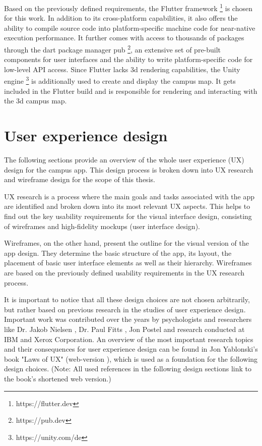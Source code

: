 Based on the previously defined requirements, the Flutter framework \footnote{https://flutter.dev} is chosen for this work. In addition to its cross-platform capabilities, it also offers the ability to compile source code into platform-specific machine code for near-native execution performance. It further comes with access to thousands of packages through the dart package manager pub \footnote{https://pub.dev}, an extensive set of pre-built components for user interfaces and the ability to write platform-specific code for low-level API access. Since Flutter lacks 3d rendering capabilities, the Unity engine \footnote{https://unity.com/de} is additionally used to create and display the campus map. It gets included in the Flutter build and is responsible for rendering and interacting with the 3d campus map.

\section{User experience design}
The following sections provide an overview of the whole user experience (UX) design for the campus app. This design process is broken down into UX research and wireframe design for the scope of this thesis.

UX research is a process where the main goals and tasks associated with the app are identified and broken down into its most relevant UX aspects. This helps to find out the key usability requirements for the visual interface design, consisting of wireframes and high-fidelity mockups (user interface design).

Wireframes, on the other hand, present the outline for the visual version of the app design. They determine the basic structure of the app, its layout, the placement of basic user interface elements as well as their hierarchy. Wireframes are based on the previously defined usability requirements in the UX research process.

It is important to notice that all these design choices are not chosen arbitrarily, but rather based on previous research in the studies of user experience design. Important work was contributed over the years by psychologists and researchers like Dr. Jakob Nielsen \cite{jakob_nielsen}, Dr. Paul Fitts \cite{paul_fitts}, Jon Postel and research conducted at IBM and Xerox Corporation. An overview of the most important research topics and their consequences for user experience design can be found in Jon Yablonski's book "Laws of UX" \cite{yablonski2020laws} (web-version \cite{yablonski_web}), which is used as a foundation for the following design choices. (Note: All used references in the following design sections link to the book's shortened web version.)

